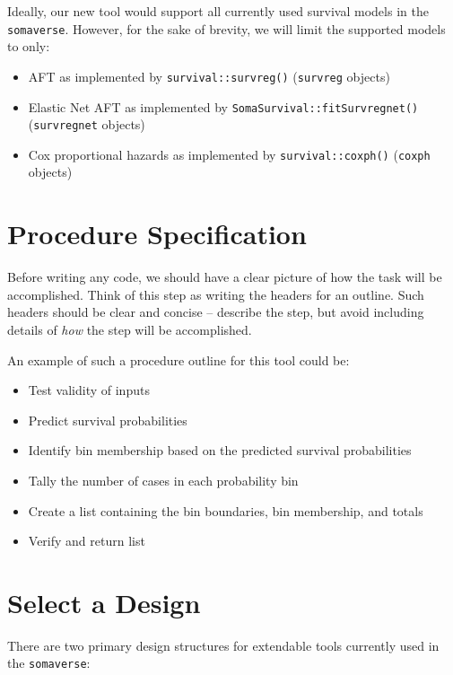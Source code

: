 \documentclass[
]{book}
\providecommand{\tightlist}{%
  \setlength{\itemsep}{0pt}\setlength{\parskip}{0pt}}
\begin{document}
Ideally, our new tool would support all currently used survival models in the \texttt{somaverse}. However, for the sake of brevity, we will limit the supported models to only:

\begin{itemize}
\tightlist
\item
  AFT as implemented by \texttt{survival::survreg()} (\texttt{survreg} objects)
\item
  Elastic Net AFT as implemented by \texttt{SomaSurvival::fitSurvregnet()} (\texttt{survregnet} objects)
\item
  Cox proportional hazards as implemented by \texttt{survival::coxph()} (\texttt{coxph} objects)
\end{itemize}

\hypertarget{procedure-specification}{%
\section{Procedure Specification}\label{procedure-specification}}

Before writing any code, we should have a clear picture of how the task will be accomplished. Think of this step as writing the headers for an outline. Such headers should be clear and concise -- describe the step, but avoid including details of \emph{how} the step will be accomplished.

An example of such a procedure outline for this tool could be:

\begin{itemize}
\tightlist
\item
  Test validity of inputs
\item
  Predict survival probabilities
\item
  Identify bin membership based on the predicted survival probabilities
\item
  Tally the number of cases in each probability bin
\item
  Create a list containing the bin boundaries, bin membership, and totals
\item
  Verify and return list
\end{itemize}

\hypertarget{select-a-design}{%
\section{Select a Design}\label{select-a-design}}

There are two primary design structures for extendable tools currently used in the \texttt{somaverse}:
\end{document}
